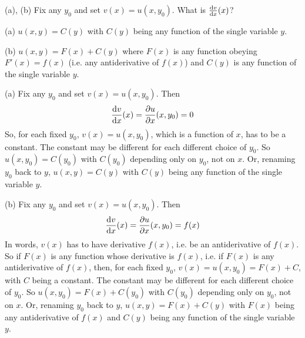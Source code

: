 \begin{hint}
(a), (b) Fix any $y_0$ and set $v(x)=u(x,y_0)$. What is $\diff{v}{x}(x)$? 
\end{hint}

\begin{answer}
(a) $u(x,y)=C(y)$ with $C(y)$ being any function of the single variable $y$.

(b) $u(x,y)=F(x)+C(y)$ where $F(x)$ is any function obeying $F'(x)=f(x)$
(i.e. any antiderivative of $f(x)$) and $C(y)$ is any function of the single variable $y$.


\end{answer}

\begin{solution}
(a) Fix any $y_0$ and set $v(x)=u(x,y_0)$. Then
\begin{align*}
\diff{v}{x}(x) =\pdiff{u}{x}(x,y_0) = 0
\end{align*}
So, for each fixed $y_0$, $v(x)=u(x,y_0)$, which is a function of $x$, has to be 
a constant. The constant may be different for each different choice of $y_0$. 
So $u(x,y_0) = C(y_0)$ with $C(y_0)$ depending only on $y_0$, not on $x$. 
Or, renaming $y_0$ back to $y$, $u(x,y)=C(y)$ with $C(y)$ being any 
function of the single variable $y$. 

(b) Fix any $y_0$ and set $v(x)=u(x,y_0)$. Then
\begin{align*}
\diff{v}{x}(x) =\pdiff{u}{x}(x,y_0) = f(x)
\end{align*}
In words, $v(x)$ has to have derivative $f(x)$, i.e. be an antiderivative 
of $f(x)$. So if $F(x)$ is any function whose derivative is $f(x)$, i.e. 
if $F(x)$ is any antiderivative of $f(x)$, then, for each fixed $y_0$, $v(x)=u(x,y_0) = F(x) +C$, with $C$ being a constant. The constant may be different for each different choice of $y_0$. 
So $u(x,y_0) = F(x)+ C(y_0)$ with $C(y_0)$ depending only on $y_0$, not on $x$. 
Or, renaming $y_0$ back to $y$, $u(x,y)=F(x) + C(y)$ with $F(x)$ being
any antiderivative of $f(x)$ and $C(y)$ being any 
function of the single variable $y$. 
\end{solution}


\subsection*{\Procedural}


